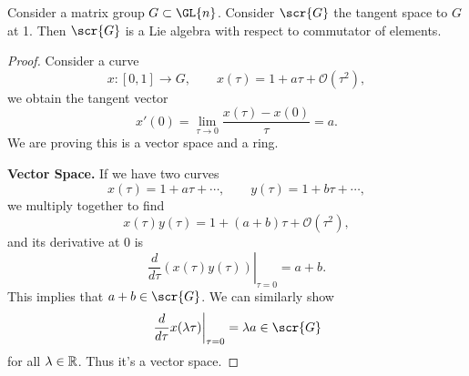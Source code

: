 \begin{thm}
Consider a matrix group $G\subset\GL{n}$. Consider $\scr{G}$ the
tangent space to $G$ at 1. Then $\scr{G}$ is a Lie algebra with
respect to commutator of elements.
\end{thm}
\begin{proof}
Consider a curve
\begin{equation}
x\colon[0,1]\to G,\qquad x(\tau)=1+a\tau+\mathcal{O}(\tau^{2}),
\end{equation}
we obtain the tangent vector
\begin{equation}
x'(0)=\lim_{\tau\to0}\frac{x(\tau)-x(0)}{\tau}=a.
\end{equation}
We are proving this is a vector space and a ring.

\noindent\textbf{Vector Space.} If we have two
curves
\begin{equation}
x(\tau)=1+a\tau+\cdots,\qquad y(\tau)=1+b\tau+\cdots,
\end{equation}
we multiply together to find
\begin{equation}
x(\tau)y(\tau)=1+(a+b)\tau+\mathcal{O}(\tau^{2}),
\end{equation}
and its derivative at 0 is
\begin{equation}
\left.\frac{d}{d\tau}(x(\tau)y(\tau))\right|_{\tau=0}=a+b.
\end{equation}
This implies that $a+b\in\scr{G}$. We can similarly show
\begin{equation}
\left.\frac{d}{d\tau}x(\lambda\tau)\right|_{\tau=0}=\lambda a\in\scr{G}
\end{equation}
for all $\lambda\in\Bbb{R}$. Thus it's a vector space.


\end{proof}
